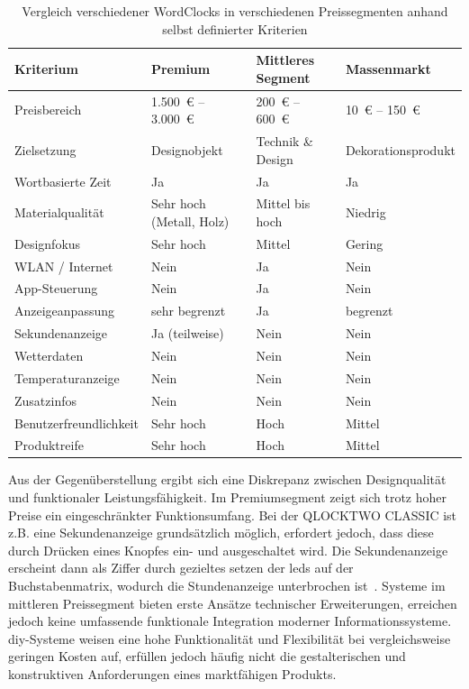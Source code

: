 \begin{table}[H]
\caption[Vergleich verschiedener WordClocks]{Vergleich verschiedener WordClocks in verschiedenen Preissegmenten anhand selbst definierter Kriterien}
\centering
\begin{tabular}{|p{4cm}|p{3.5cm}|p{3.5cm}|p{3.5cm}|}
\hline
\textbf{Kriterium} & \textbf{Premium} & \textbf{Mittleres Segment} & \textbf{Massenmarkt} \\
\hline
Preisbereich & 1.500~€ -- 3.000~€ & 200~€ -- 600~€ & 10~€ -- 150~€ \\
\hline
Zielsetzung & Designobjekt & Technik \& Design & Dekorationsprodukt \\
\hline
Wortbasierte Zeit & Ja & Ja & Ja \\
\hline
Materialqualität & Sehr hoch (Metall, Holz) & Mittel bis hoch & Niedrig \\
\hline
Designfokus & Sehr hoch & Mittel & Gering \\
\hline
WLAN / Internet & Nein & Ja & Nein \\
\hline
App-Steuerung & Nein & Ja & Nein \\
\hline
Anzeigeanpassung & sehr begrenzt & Ja & begrenzt \\
\hline
Sekundenanzeige & Ja (teilweise) & Nein & Nein \\
\hline
Wetterdaten & Nein & Nein & Nein \\
\hline
Temperaturanzeige & Nein & Nein & Nein \\
\hline
Zusatzinfos & Nein & Nein & Nein \\
\hline
Benutzerfreundlichkeit & Sehr hoch & Hoch & Mittel \\
\hline
Produktreife & Sehr hoch & Hoch & Mittel \\
\hline
\end{tabular}
\label{tab:vergleich_wordclock_ohne_diy}
\end{table}

Aus der Gegenüberstellung ergibt sich eine Diskrepanz zwischen Designqualität und funktionaler Leistungsfähigkeit. 
Im Premiumsegment zeigt sich trotz hoher Preise ein eingeschränkter Funktionsumfang.
Bei der QLOCKTWO CLASSIC ist z.B. eine Sekundenanzeige grundsätzlich möglich, erfordert jedoch, dass diese durch Drücken eines Knopfes ein- und ausgeschaltet wird.
Die Sekundenanzeige erscheint dann als Ziffer durch gezieltes setzen der \gls{led}s auf der Buchstabenmatrix, wodurch die Stundenanzeige unterbrochen ist~\cite{QlockTwoClassicSekundenanzeige}. 
Systeme im mittleren Preissegment bieten erste Ansätze technischer Erweiterungen, erreichen jedoch keine umfassende funktionale Integration moderner Informationssysteme. 
\gls{diy}-Systeme weisen eine hohe Funktionalität und Flexibilität bei vergleichsweise geringen Kosten auf, erfüllen jedoch häufig nicht die gestalterischen und konstruktiven Anforderungen eines marktfähigen Produkts.

